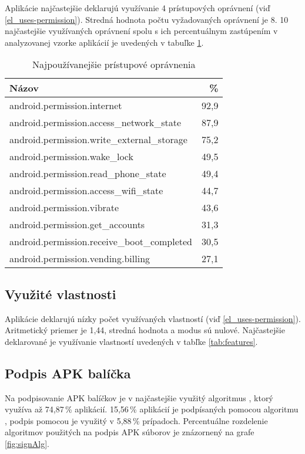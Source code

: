 Aplikácie najčastejšie deklarujú využívanie 4 prístupových oprávnení (viď \ref{el_uses-permission}). Stredná hodnota počtu vyžadovaných oprávnení je 8. 10 najčastejšie využívaných oprávnení spolu s ich percentuálnym zastúpením v analyzovanej vzorke aplikácií je uvedených v tabuľke \ref{tab:permissions}. 
\begin{table}[!htbp]
\centering
  \begin{tabular}{|l r|}
    \hline
    Názov & \% \\\hline\hline
    android.permission.internet & 92,9 \\
    android.permission.access\_network\_state & 87,9 \\
    android.permission.write\_external\_storage & 75,2 \\
    android.permission.wake\_lock & 49,5 \\
    android.permission.read\_phone\_state & 49,4 \\
    android.permission.access\_wifi\_state & 44,7 \\
    android.permission.vibrate & 43,6 \\
    android.permission.get\_accounts & 31,3 \\
    android.permission.receive\_boot\_completed & 30,5 \\
    android.permission.vending.billing & 27,1 \\
    \hline
  \end{tabular}
  \caption{Najpoužívanejšie prístupové oprávnenia}
  \label{tab:permissions}
\end{table}

\subsection*{Využité vlastnosti}
Aplikácie deklarujú nízky počet využívaných vlastností (viď \ref{el_uses-permission}). Aritmetický priemer je 1,44, stredná hodnota a modus sú nulové. Najčastejšie deklarované je využívanie vlastností uvedených v tabľke \ref{tab:features}.

\subsection{Podpis APK balíčka}
Na podpisovanie APK balíčkov je v najčastejšie využitý algoritmus , ktorý využíva až 74,87\,\% aplikácií. 15,56\,\% aplikácií je podpísaných pomocou algoritmu , podpis pomocou  je využitý v 5,88\,\% prípadoch. Percentuálne rozdelenie algoritmov použitých na podpis APK súborov je znázornený na grafe \ref{fig:signAlg}.


